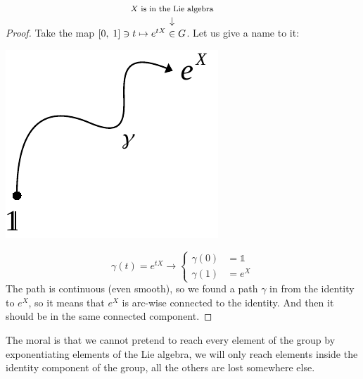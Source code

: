 \documentclass[../main.tex]{subfiles}
\begin{document}
\begin{proof}
Take the map $\bqty{0,\;1}\ni t \mapsto e^{tX}\overset{\mathclap{\tikz \node {$\downarrow$} node [above=1.25ex] {\footnotesize $X$ is in the Lie algebra};}}{\in}G$. Let us give a name to it:
\begin{marginfigure}
	\includegraphics[width=1\linewidth]{images/matrix-lie-algebra.pdf}
	\caption[Arcwise connected path]{}
\end{marginfigure}
\[
\gamma(t)=e^{tX}\xrightarrow[]{}\begin{cases}
    \gamma(0)&=\mathbb{1}\\
    \gamma(1)&=e^{X}
\end{cases}
\]
The path is continuous (even smooth), so we found a path $\gamma$ in  from the identity to $e^{X}$, so it means that $e^{X}$ is arc-wise connected to the identity. And then it should be in the same connected component.
\end{proof}
The moral is that we cannot pretend to reach every element of the group by exponentiating elements of the Lie algebra, we will only reach elements inside the identity component of the group, all the others are lost somewhere else.
\end{document}
